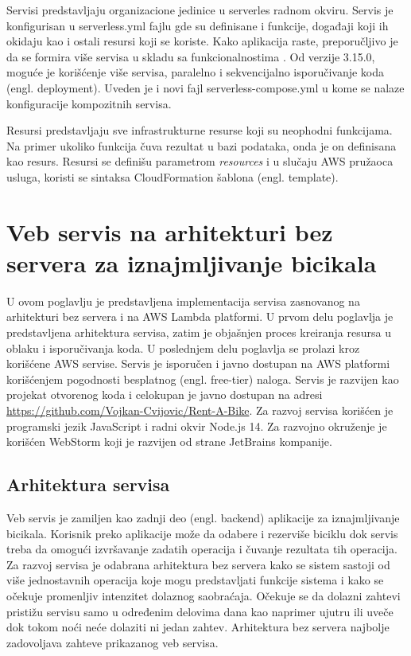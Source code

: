 \documentclass[12pt,oneside]{memoir}
\begin{document}
Servisi predstavljaju organizacione jedinice u serverles radnom okviru. Servis je konfigurisan u serverless.yml fajlu gde su definisane i funkcije, događaji koji ih okidaju kao i ostali resursi koji se koriste. Kako aplikacija raste, preporučljivo je da se formira više servisa u skladu sa funkcionalnostima \cite{sfs}. Od verzije 3.15.0, moguće je korišćenje više servisa, paralelno i sekvencijalno isporučivanje koda (engl. deployment). Uveden je i novi fajl serverless-compose.yml u kome se nalaze konfiguracije kompozitnih servisa.
 
Resursi predstavljaju sve infrastrukturne resurse koji su neophodni funkcijama. Na primer ukoliko funkcija čuva rezultat u bazi podataka, onda je on definisana kao resurs. Resursi se definišu parametrom \emph{resources} i u slučaju AWS pružaoca usluga, koristi se sintaksa CloudFormation šablona (engl. template).


\chapter{Veb servis na arhitekturi bez servera za iznajmljivanje bicikala}
 
U ovom poglavlju je predstavljena implementacija servisa zasnovanog na arhitekturi bez servera i na AWS Lambda platformi. U prvom delu poglavlja je predstavljena arhitektura servisa, zatim je objašnjen proces kreiranja resursa u oblaku i isporučivanja koda. U poslednjem delu poglavlja se prolazi kroz korišćene AWS servise. Servis je isporučen i javno dostupan na AWS platformi korišćenjem pogodnosti besplatnog (engl. free-tier) naloga. Servis je razvijen kao projekat otvorenog koda i celokupan je javno dostupan na adresi \url{https://github.com/Vojkan-Cvijovic/Rent-A-Bike}. Za razvoj servisa korišćen je programski jezik JavaScript i radni okvir Node.js 14. Za razvojno okruženje je korišćen WebStorm koji je razvijen od strane JetBrains kompanije.


\section{Arhitektura servisa}

Veb servis je zamiljen kao zadnji deo (engl. backend) aplikacije za iznajmljivanje bicikala. Korisnik preko aplikacije može da odabere i rezerviše biciklu dok servis treba da omogući izvršavanje zadatih operacija i čuvanje rezultata tih operacija. Za razvoj servisa je odabrana arhitektura bez servera kako se sistem sastoji od više jednostavnih operacija koje mogu predstavljati funkcije sistema i kako se očekuje promenljiv intenzitet dolaznog saobraćaja. Očekuje se da dolazni zahtevi pristižu servisu samo u određenim delovima dana kao naprimer ujutru ili uveče dok tokom noći neće dolaziti ni jedan zahtev. Arhitektura bez servera najbolje zadovoljava zahteve prikazanog veb servisa.
\end{document}
